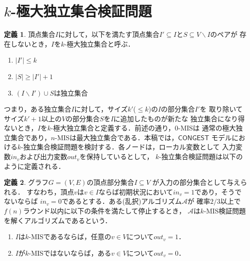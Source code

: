 \documentclass[12pt]{thesis}
\newcommand{\CONGEST}{\textsf{CONGEST}}
\newcommand{\Inp}{\mathit{in}}
\newcommand{\Out}{\mathit{out}}
\theoremstyle{definition}
\newtheorem{definition}{定義}[chapter]
\begin{document}
\section{$k$-極大独立集合検証問題}
\begin{definition}
頂点集合$I$に対して，以下を満たす頂点集合$I' \subseteq I$と$S\subseteq V \backslash I$のペアが
存在しないとき，$I$を$k$-極大独立集合と呼ぶ．
\begin{enumerate}
\item $|I'| \leq k$
\item $|S| \geq |I'| + 1$
\item $(I \backslash I') \cup S$は独立集合
\end{enumerate}
\end{definition}
つまり，ある独立集合$I$に対して，サイズ$k'$($\leq k$)の$I$の部分集合$I'$を
取り除いてサイズ$k' + 1$以上の$V$の部分集合$S$を$I$に追加したものが新たな
独立集合になり得ないとき，$I$を$k$-極大独立集合と定義する．前述の通り，$0$-MISは
通常の極大独立集合であり，$n$-MISは最大独立集合である．本稿では，${\CONGEST}$
モデルにおける$k$-独立集合検証問題を検討する．各ノードは，ローカル変数として
入力変数$\Inp_v$および出力変数$\Out_v$を保持しているとして，
$k$-独立集合検証問題は以下のように定義される．

\begin{definition}
グラフ$G=(V,E)$の頂点部分集合$I \subseteq V$ が入力の部分集合として与えられる．
すなわち，頂点$v$は$v\in I$ならば初期状況において$\Inp_v = 1$であり，そうでないならば
$\Inp_v = 0$であるとする．ある(乱択)アルゴリズム$\mathcal{A}$が
確率$2/3$以上で$f(n)$ラウンド以内に以下の条件を満たして停止するとき，
$\mathcal{A}$は$k$-MIS検証問題を解くアルゴリズムであるという．
\begin{enumerate}
\item $I$は$k$-MISであるならば，任意の$v \in V$について$\Out_v = 1$．
\item $I$が$k$-MISではないならば，ある$v \in V$について$\Out_v = 0$．
\end{enumerate}
\end{definition}
\end{document}
